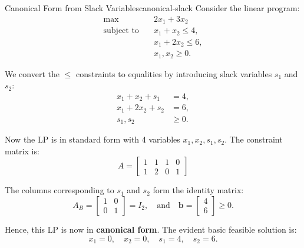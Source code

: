 \begin{example}{Canonical Form from Slack Variables}{canonical-slack}
Consider the linear program:
\[
\begin{aligned}
\max \quad & 2x_1 + 3x_2 \\
\text{subject to} \quad 
& x_1 + x_2 \leq 4, \\
& x_1 + 2x_2 \leq 6, \\
& x_1, x_2 \geq 0.
\end{aligned}
\]

We convert the \( \leq \) constraints to equalities by introducing slack variables \( s_1 \) and \( s_2 \):
\[
\begin{aligned}
x_1 + x_2 + s_1 &= 4, \\
x_1 + 2x_2 + s_2 &= 6, \\
s_1, s_2 &\geq 0.
\end{aligned}
\]

Now the LP is in standard form with 4 variables \( x_1, x_2, s_1, s_2 \). The constraint matrix is:
\[
A = \begin{bmatrix}
1 & 1 & 1 & 0 \\
1 & 2 & 0 & 1
\end{bmatrix}
\]

The columns corresponding to \( s_1 \) and \( s_2 \) form the identity matrix:
\[
A_B = \begin{bmatrix}
1 & 0 \\
0 & 1
\end{bmatrix}
= I_2,
\quad \text{and} \quad
\mathbf{b} = \begin{bmatrix} 4 \\ 6 \end{bmatrix} \geq 0.
\]

Hence, this LP is now in \textbf{canonical form}. The evident basic feasible solution is:
\[
x_1 = 0, \quad x_2 = 0, \quad s_1 = 4, \quad s_2 = 6.
\]
\end{example}


